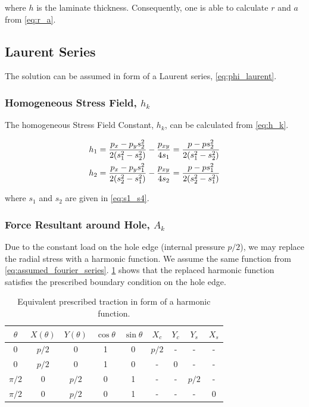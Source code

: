 \documentclass{article}
\begin{document}
where $h$ is the laminate thickness. Consequently, one is able to calculate $r$ and $a$ from \cref{eq:r_a}.

\subsection{Laurent Series}
The solution can be assumed in form of a Laurent series, \cref{eq:phi_laurent}.

\subsubsection{Homogeneous Stress Field, \texorpdfstring{$h_k$}{}}
The homogeneous Stress Field Constant, $h_k$, can be calculated from \cref{eq:h_k}.

\begin{gather}
    h_1 = \dfrac{p_x - p_y s_2^2}{2 (s_1^2 - s_2^2)} - \dfrac{p_{xy}}{4 s_1} = \dfrac{p - p s_2^2}{2 (s_1^2 - s_2^2)}  \notag \\
    h_2 = \dfrac{p_x - p_y s_1^2}{2 (s_2^2 - s_1^2)} - \dfrac{p_{xy}}{4 s_2} = \dfrac{p - p s_1^2}{2 (s_2^2 - s_1^2)} 
    \label{eq:h_k_sol}
\end{gather}

where $s_1$ and $s_2$ are given in \cref{eq:s1_s4}. 

\subsubsection{Force Resultant around Hole, \texorpdfstring{$A_k$}{}}
Due to the constant load on the hole edge (internal pressure $p/2$), we may replace the radial stress with a harmonic function. We assume the same function from \cref{eq:assumed_fourier_series}. \cref{tab:A_k} shows that the replaced harmonic function satisfies the prescribed boundary condition on the hole edge. 

\begin{table}[H]
    \centering
    \caption{Equivalent prescribed traction in form of a harmonic function.}
    \begin{tabular}{ccccccccc} \hline
        $\theta$ & $X(\theta)$ & $Y(\theta)$ & $\cos\theta$ & $\sin\theta$ & $X_c$ & $Y_c$ & $Y_s$ & $X_s$   \\ \hline
        0 & $p/2$ & 0 & 1 & 0 & $p/2$ & - & -  & - \\
        0 & $p/2$ & 0 & 1 & 0 & - & 0 & -  & - \\
        $\pi/2$ & 0 & $p/2$ & 0 & 1 & - & - & $p/2$  & - \\
        $\pi/2$ & 0 & $p/2$ & 0 & 1 & - & - & - & 0 \\ \hline
    \end{tabular}
    \label{tab:A_k}
\end{table}
\end{document}
